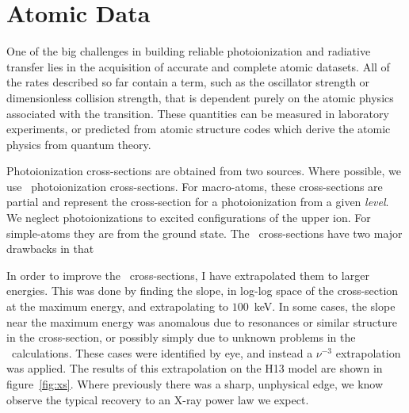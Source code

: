 \section{Atomic Data}

One of the big challenges in building reliable photoionization and radiative
transfer lies in the acquisition of accurate and complete atomic datasets.
All of the rates described so far contain a term, such as the oscillator strength 
or dimensionless collision strength, that is dependent purely on the atomic physics
associated with the transition. These quantities can be measured in laboratory experiments,
or predicted from atomic structure codes which derive the atomic physics from 
quantum theory.

Photoionization cross-sections are obtained from two sources. Where possible,
we use \top\ photoionization cross-sections. For macro-atoms,
these cross-sections are partial and represent the cross-section for a photoionization
from a given {\em level}. We neglect photoionizations to excited configurations
of the upper ion. For simple-atoms they are from the ground state.
The \top\ cross-sections have two major drawbacks in that 

In order to improve the \top\ cross-sections, I have extrapolated them to larger
energies. This was done by finding the slope, in log-log space
of the cross-section at the maximum energy, and extrapolating to $100$~keV.
In some cases, the slope near the maximum energy was anomalous 
due to resonances or similar structure in the cross-section, or possibly
simply due to unknown problems in the \top\ calculations. These
cases were identified by eye, and instead a $\nu^{-3}$ extrapolation
was applied. The results of this extrapolation on the H13 model
are shown in figure~\ref{fig:xs}. Where previously there was a sharp,
unphysical edge, we know observe the typical recovery to an X-ray 
power law we expect.

